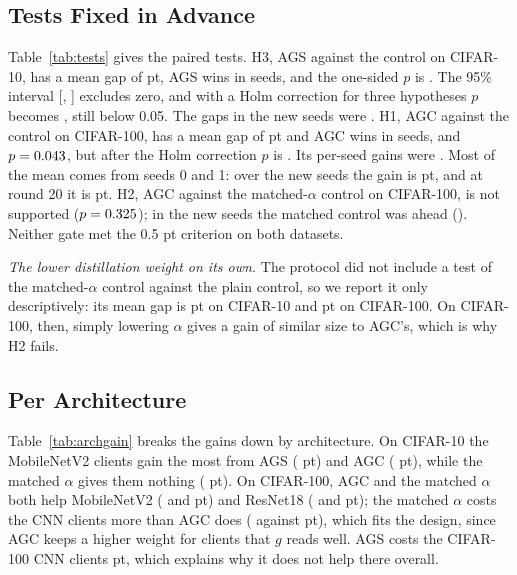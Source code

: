 \documentclass[conference]{IEEEtran}
\begin{document}
\subsection{Tests Fixed in Advance}
Table~\ref{tab:tests} gives the paired tests. H3, AGS against the control on CIFAR-10, has a mean gap of \GTenAgsCtlBest{} pt, AGS wins in \GTenAgsCtlBestWins{} seeds, and the one-sided $p$ is \GTenAgsCtlBestPone{}. The 95\% interval [\GTenAgsCtlBestLo{}, \GTenAgsCtlBestHi{}] excludes zero, and with a Holm correction for three hypotheses $p$ becomes \HolmThree{}, still below 0.05. The gaps in the new seeds were \GTenAgsCtlBestNew{}. H1, AGC against the control on CIFAR-100, has a mean gap of \GHunAgcCtlBest{} pt and AGC wins in \GHunAgcCtlBestWins{} seeds, and $p=0.043{}$, but after the Holm correction $p$ is \HolmOne{}. Its per-seed gains were \GHunAgcCtlBestSeeds{}. Most of the mean comes from seeds 0 and 1: over the new seeds the gain is \GHunAgcCtlBestNewMean{} pt, and at round 20 it is \GHunAgcCtlLast{} pt. H2, AGC against the matched-$\alpha$ control on CIFAR-100, is not supported ($p=0.325{}$); in the new seeds the matched control was ahead (\GHunAgcAmBestNew{}). Neither gate met the 0.5 pt criterion on both datasets.

\begin{table}[t]
\centering
\caption{Paired comparisons of best-round accuracy over seeds \SeedList{}. Mean gap and 95\% confidence interval in pt; $p$ from a paired $t$-test, one-sided (1s) for the hypotheses fixed in advance and two-sided (2s) otherwise; wins = seeds in which the first method is better; last column = mean gap over the new seeds only (2 and later).}
\label{tab:tests}
\footnotesize
\TabTests
\end{table}

\textit{The lower distillation weight on its own.} The protocol did not include a test of the matched-$\alpha$ control against the plain control, so we report it only descriptively: its mean gap is \GTenAmCtlBest{} pt on CIFAR-10 and \GHunAmCtlBest{} pt on CIFAR-100. On CIFAR-100, then, simply lowering $\alpha$ gives a gain of similar size to AGC's, which is why H2 fails.

\subsection{Per Architecture}
Table~\ref{tab:archgain} breaks the gains down by architecture. On CIFAR-10 the MobileNetV2 clients gain the most from AGS (\GainTenAgsMob{} pt) and AGC (\GainTenAgcMob{} pt), while the matched $\alpha$ gives them nothing (\GainTenAmMob{} pt). On CIFAR-100, AGC and the matched $\alpha$ both help MobileNetV2 (\GainHunAgcMob{} and \GainHunAmMob{} pt) and ResNet18 (\GainHunAgcRes{} and \GainHunAmRes{} pt); the matched $\alpha$ costs the CNN clients more than AGC does (\GainHunAmCnn{} against \GainHunAgcCnn{} pt), which fits the design, since AGC keeps a higher weight for clients that $g$ reads well. AGS costs the CIFAR-100 CNN clients \GainHunAgsCnn{} pt, which explains why it does not help there overall.
\end{document}
